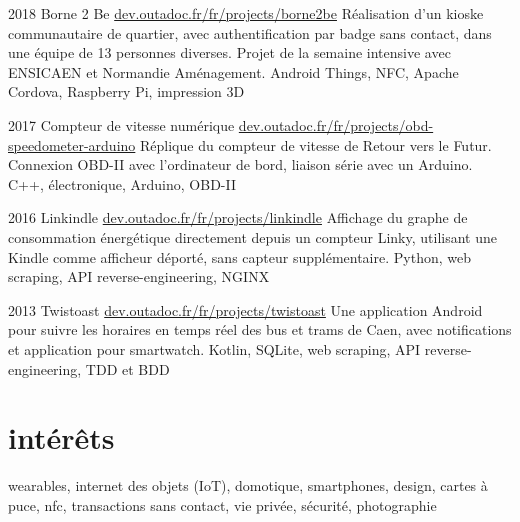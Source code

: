 \documentclass[]{friggeri-cv}
\begin{document}
\begin{entrylist}
    \entry
    {2018}
    {Borne 2 Be}
    {\href{https://dev.outadoc.fr/fr/projects/borne2be}{dev.outadoc.fr/fr/projects/borne2be}}
    {Réalisation d'un kioske communautaire de quartier, avec authentification par badge sans contact, dans une équipe de 13 personnes diverses. Projet de la semaine intensive avec ENSICAEN et Normandie Aménagement.}
    {Android Things, NFC, Apache Cordova, Raspberry Pi, impression 3D}
    
    \entry
    {2017}
    {Compteur de vitesse numérique}
    {\href{https://dev.outadoc.fr/fr/projects/obd-speedometer-arduino}{dev.outadoc.fr/fr/projects/obd-speedometer-arduino}}
    {Réplique du compteur de vitesse de Retour vers le Futur. Connexion OBD-II avec l'ordinateur de bord, liaison série avec un Arduino.}
    {C++, électronique, Arduino, OBD-II}
    
    \entry
    {2016}
    {Linkindle}
    {\href{https://dev.outadoc.fr/fr/projects/linkindle}{dev.outadoc.fr/fr/projects/linkindle}}
    {Affichage du graphe de consommation énergétique directement depuis un compteur Linky, utilisant une Kindle comme afficheur déporté, sans capteur supplémentaire.}
    {Python, web scraping, API reverse-engineering, NGINX}
    
    \entry
    {2013}
    {Twistoast}
    {\href{https://dev.outadoc.fr/fr/projects/twistoast}{dev.outadoc.fr/fr/projects/twistoast}}
    {Une application Android pour suivre les horaires en temps réel des bus et trams de Caen, avec notifications et application pour smartwatch.}
    {Kotlin, SQLite, web scraping, API reverse-engineering, TDD et BDD}
\end{entrylist}

\section{intérêts}

wearables, internet des objets (IoT), domotique, smartphones, design, cartes à puce, nfc, transactions sans contact, vie privée, sécurité, photographie
\end{document}
